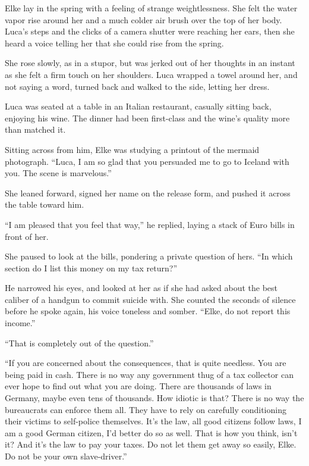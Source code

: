 Elke lay in the spring with a feeling of strange weightlessness. She felt the water vapor rise around her and a much colder air brush over the top of her body. Luca's steps and the clicks of a camera shutter were reaching her ears, then she heard a voice telling her that she could rise from the spring.

She rose slowly, as in a stupor, but was jerked out of her thoughts in an instant as she felt a firm touch on her shoulders. Luca wrapped a towel around her, and not saying a word, turned back and walked to the side, letting her dress.

\sectionline

Luca was seated at a table in an Italian restaurant, casually sitting back, enjoying his wine. The dinner had been first-class and the wine's quality more than matched it.

Sitting across from him, Elke was studying a printout of the mermaid photograph. ``Luca, I am so glad that you persuaded me to go to Iceland with you. The scene is marvelous.''

She leaned forward, signed her name on the release form, and pushed it across the table toward him.

``I am pleased that you feel that way,'' he replied, laying a stack of Euro bills in front of her.

She paused to look at the bills, pondering a private question of hers. ``In which section do I list this money on my tax return?''

He narrowed his eyes, and looked at her as if she had asked about the best caliber of a handgun to commit suicide with. She counted the seconds of silence before he spoke again, his voice toneless and somber. ``Elke, do not report this income.''

``That is completely out of the question.''

``If you are concerned about the consequences, that is quite needless. You are being paid in cash. There is no way any government thug of a tax collector can ever hope to find out what you are doing. There are thousands of laws in Germany, maybe even tens of thousands. How idiotic is that? There is no way the bureaucrats can enforce them all. They have to rely on carefully conditioning their victims to self-police themselves. It's the law, all good citizens follow laws, I am a good German citizen, I'd better do so as well. That is how you think, isn't it? And it's the law to pay your taxes. Do not let them get away so easily, Elke. Do not be your own slave-driver.''

